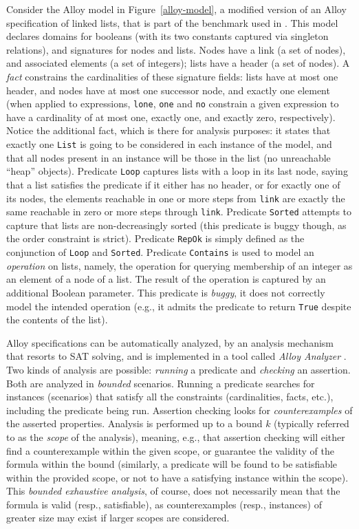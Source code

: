 Consider the Alloy model in Figure~\ref{alloy-model}, a modified version of an Alloy specification of linked lists, that is part of the benchmark used in \cite{Wang+2018}. This model declares domains for booleans (with its two constants captured via singleton relations), and signatures for nodes and lists. Nodes have a link (a set of nodes), and associated elements (a set of integers); lists have a header (a set of nodes). A \emph{fact} constrains the cardinalities of these signature fields: lists have at most one header, and nodes have at most one successor node, and exactly one element (when applied to expressions, \texttt{lone}, \texttt{one} and \texttt{no} constrain a given expression to have a cardinality of at most one, exactly one, and exactly zero, respectively). Notice the additional fact, which is there for analysis purposes: it states that exactly one \texttt{List} is going to be considered in each instance of the model, and that all nodes present in an instance will be those in the list (no unreachable ``heap'' objects). Predicate \texttt{Loop} captures lists with a loop in its last node, saying that a list satisfies the predicate if it either has no header, or for exactly one of its nodes, the elements reachable in one or more steps from \texttt{link} are exactly the same reachable in zero or more steps through \texttt{link}. Predicate \texttt{Sorted} attempts to capture that lists are non-decreasingly sorted (this predicate is buggy though, as the order constraint is strict). Predicate \texttt{RepOk} is simply defined as the conjunction of \texttt{Loop} and \texttt{Sorted}. Predicate \texttt{Contains} is used to model an \emph{operation} on lists, namely, the operation for querying membership of an integer as an element of a node of a list. The result of the operation is captured by an additional Boolean parameter. This predicate is \emph{buggy}, it does not correctly model the intended operation (e.g., it admits the predicate to return \texttt{True} despite the contents of the list). 

Alloy specifications can be automatically analyzed, by an analysis mechanism that resorts to SAT solving, and is implemented in a tool called \emph{Alloy Analyzer} \cite{Jackson2006}. Two kinds of analysis are possible: \emph{running} a predicate and \emph{checking} an assertion. Both are analyzed in \emph{bounded} scenarios. Running a predicate searches for instances (scenarios) that satisfy all the constraints (cardinalities, facts, etc.), including the predicate being run. Assertion checking looks for \emph{counterexamples} of the asserted properties. Analysis is performed up to a bound $k$ (typically referred to as the \emph{scope} of the analysis), meaning, e.g., that assertion checking will either find a counterexample within the given scope, or guarantee the validity of the formula within the bound (similarly, a predicate will be found to be satisfiable within the provided scope, or not to have a satisfying instance within the scope). This \emph{bounded exhaustive analysis}, of course, does not necessarily mean that the formula is valid (resp., satisfiable), as counterexamples (resp., instances) of greater size may exist if larger scopes are considered.


